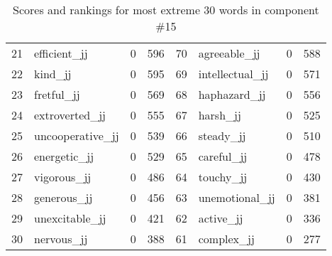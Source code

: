 \begin{table}[tbp]
\begin{tabular}{| rlr@{.}l | rlr@{.}l |}
    21 & efficient\_jj & 0 & 596    &    70 & agreeable\_jj & 0 & 588 \\
    22 & kind\_jj & 0 & 595    &    69 & intellectual\_jj & 0 & 571 \\
    23 & fretful\_jj & 0 & 569    &    68 & haphazard\_jj & 0 & 556 \\
    24 & extroverted\_jj & 0 & 555    &    67 & harsh\_jj & 0 & 525 \\
    25 & uncooperative\_jj & 0 & 539    &    66 & steady\_jj & 0 & 510 \\
    26 & energetic\_jj & 0 & 529    &    65 & careful\_jj & 0 & 478 \\
    27 & vigorous\_jj & 0 & 486    &    64 & touchy\_jj & 0 & 430 \\
    28 & generous\_jj & 0 & 456    &    63 & unemotional\_jj & 0 & 381 \\
    29 & unexcitable\_jj & 0 & 421    &    62 & active\_jj & 0 & 336 \\
    30 & nervous\_jj & 0 & 388    &    61 & complex\_jj & 0 & 277 \\
    \hline
    \end{tabular}
    \caption{Scores and rankings for most extreme 30 words in component \#15} 
\end{table}
\clearpage
